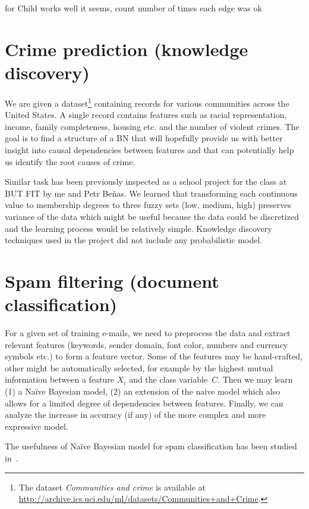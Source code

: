 \documentclass[english,cover]{fitthesis} %
\newcommand{\todo}[1]{{\color{red}#1}}
\begin{document}
\todo{for Child works well it seems, count number of times each edge was ok}





\section{Crime prediction (knowledge discovery)}
We are given a dataset\footnote{The dataset \emph{Communities and crime} is available at \url{http://archive.ics.uci.edu/ml/datasets/Communities+and+Crime}.} containing records for various communities across the United States. A single record contains features such as racial representation, income, family completeness, housing etc. and the number of violent crimes. The goal is to find a structure of a BN that will hopefully provide us with better insight into causal dependencies between features and that can potentially help us identify the root causes of crime.

Similar task has been previously inspected as a school project for the  class at BUT FIT by me and Petr Beňas. We learned that transforming each continuous value to membership degrees to three fuzzy sets (low, medium, high) preserves variance of the data which might be useful because the data could be discretized and the learning process would be relatively simple. Knowledge discovery techniques used in the project did not include any probabilistic model.


\section{Spam filtering (document classification)}
For a given set of training e-mails, we need to preprocess the data and extract relevant features (keywords, sender domain, font color, numbers and currency symbols etc.) to form a feature vector. Some of the features may be hand-crafted, other might be automatically selected, for example by the highest mutual information between a feature $X_i$ and the class variable~$C$. Then we may learn (1) a Naïve Bayesian model, (2) an extension of the naive model which also allows for a limited degree of dependencies between features. Finally, we can analyze the increase in accuracy (if any) of the more complex and more expressive model.

The usefulness of Naïve Bayesian model for spam classification has been studied in~\cite{heckerman98_spam}.
\end{document}
